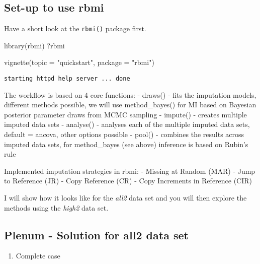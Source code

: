 \documentclass[
  letterpaper,
  DIV=11,
  numbers=noendperiod]{scrreprt}
\newenvironment{Shaded}{\begin{snugshade}}{\end{snugshade}}
\newcommand{\AttributeTok}[1]{\textcolor[rgb]{0.40,0.45,0.13}{#1}}
\newcommand{\FunctionTok}[1]{\textcolor[rgb]{0.28,0.35,0.67}{#1}}
\newcommand{\NormalTok}[1]{\textcolor[rgb]{0.00,0.23,0.31}{#1}}
\newcommand{\StringTok}[1]{\textcolor[rgb]{0.13,0.47,0.30}{#1}}
\providecommand{\tightlist}{%
  \setlength{\itemsep}{0pt}\setlength{\parskip}{0pt}}\usepackage{longtable,booktabs,array}
\begin{document}
\hypertarget{set-up-to-use-rbmi}{%
\subsection{Set-up to use rbmi}\label{set-up-to-use-rbmi}}

Have a short look at the \texttt{rbmi()} package first.

\begin{Shaded}
\begin{Highlighting}[]
\FunctionTok{library}\NormalTok{(rbmi)}
\NormalTok{?rbmi}

\FunctionTok{vignette}\NormalTok{(}\AttributeTok{topic =} \StringTok{"quickstart"}\NormalTok{, }\AttributeTok{package =} \StringTok{"rbmi"}\NormalTok{)}
\end{Highlighting}
\end{Shaded}

\begin{verbatim}
starting httpd help server ... done
\end{verbatim}

The workflow is based on 4 core functions: - draws() - fits the
imputation models, different methods possible, we will use
method\_bayes() for MI based on Bayesian posterior parameter draws from
MCMC sampling - impute() - creates multiple imputed data sets -
analyse() - analyses each of the multiple imputed data sets, default =
ancova, other options possible - pool() - combines the results across
imputed data sets, for method\_bayes (see above) inference is based on
Rubin's rule

Implemented imputation strategies in rbmi: - Missing at Random (MAR) -
Jump to Reference (JR) - Copy Reference (CR) - Copy Increments in
Reference (CIR)

I will show how it looks like for the \emph{all2} data set and you will
then explore the methods using the \emph{high2} data set.

\hypertarget{plenum---solution-for-all2-data-set}{%
\subsection{Plenum - Solution for all2 data
set}\label{plenum---solution-for-all2-data-set}}

\begin{enumerate}
\def\labelenumi{\arabic{enumi}.}
\tightlist
\item
  Complete case
\end{enumerate}
\end{document}
